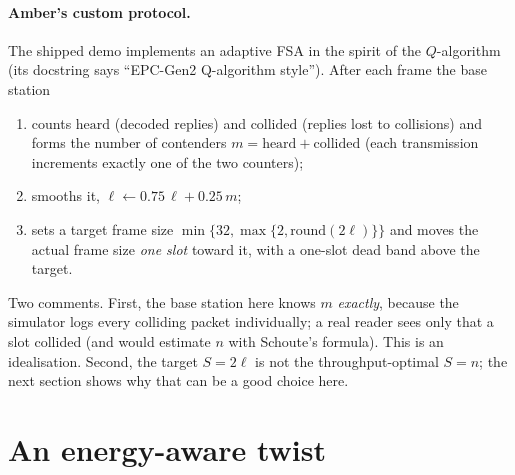 \paragraph{Amber's custom protocol.}
The shipped  demo implements an adaptive FSA in the spirit of the
$Q$-algorithm (its docstring says ``EPC-Gen2 Q-algorithm style''). After each frame the base station
\begin{enumerate}
 \item counts $\text{heard}$ (decoded replies) and $\text{collided}$ (replies lost to collisions) and
   forms the number of contenders $m=\text{heard}+\text{collided}$ (each transmission increments exactly one of
   the two counters);
 \item smooths it, $\ell\leftarrow0.75\,\ell+0.25\,m$;
 \item sets a target frame size $\min\{32,\max\{2,\mathrm{round}(2\ell)\}\}$ and moves the actual frame size \emph{one slot} toward it, with a one-slot dead band above the target.
\end{enumerate}
Two comments. First, the base station here knows $m$ \emph{exactly}, because the simulator logs every colliding
packet individually; a real reader sees only that a slot collided (and would estimate $n$ with Schoute's formula).
This is an idealisation. Second, the target $S=2\ell$ is not the throughput-optimal $S=n$; the next section shows why that
can be a good choice here.

\section{An energy-aware twist}
\label{sec:energytwist}


